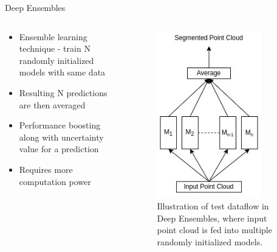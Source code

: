 \documentclass[aspectratio=169]{beamer}
\begin{document}
\begin{frame}{Deep Ensembles}
    \begin{columns}
        \begin{column}{0.5\textwidth}
            \begin{itemize}
                \item Ensemble learning technique - train N randomly initialized models with same data
                \item Resulting N predictions are then averaged
                \item Performance boosting along with uncertainty value for a prediction
                \item Requires more computation power
            \end{itemize}
        \end{column}
        \begin{column}{0.5\textwidth}
            \begin{figure}
                \centering
                \includegraphics[scale=0.5]{images/deep_ensembles.jpg}
                \caption{Illustration of test dataflow in Deep Ensembles, where input point cloud is fed into multiple
                randomly initialized models.}
                \label{fig:deep_ensembles_work}    
            \end{figure}
        \end{column}
    \end{columns}
\end{frame}
\end{document}
